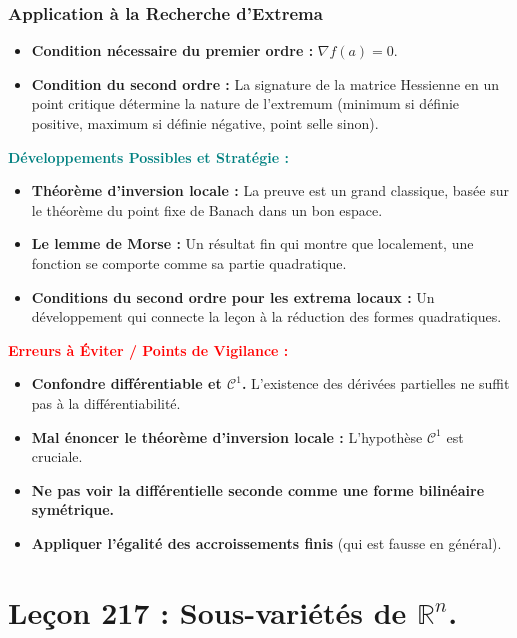 \documentclass[12pt, a4paper, parskip=full]{report}
\theoremstyle{agregstyle}
\newenvironment{developpements}
  {\par\medskip\noindent\begin{oframed}\noindent\textbf{\textcolor{teal}{Développements Possibles et Stratégie :}}}
  {\end{oframed}\par\medskip}
\newenvironment{erreurs}
  {\par\medskip\noindent\begin{oframed}\noindent\textbf{\textcolor{red}{Erreurs à Éviter / Points de Vigilance :}}}
  {\end{oframed}\par\medskip}
\begin{document}
\subsection{Application à la Recherche d'Extrema}
\begin{itemize}
    \item \textbf{Condition nécessaire du premier ordre :} $\nabla f(a) = 0$.
    \item \textbf{Condition du second ordre :} La signature de la matrice Hessienne en un point critique détermine la nature de l'extremum (minimum si définie positive, maximum si définie négative, point selle sinon).
\end{itemize}

\begin{developpements}
    \begin{itemize}
        \item \textbf{Théorème d'inversion locale :} La preuve est un grand classique, basée sur le théorème du point fixe de Banach dans un bon espace.
        \item \textbf{Le lemme de Morse :} Un résultat fin qui montre que localement, une fonction se comporte comme sa partie quadratique.
        \item \textbf{Conditions du second ordre pour les extrema locaux :} Un développement qui connecte la leçon à la réduction des formes quadratiques.
    \end{itemize}
\end{developpements}

\begin{erreurs}
    \begin{itemize}
        \item \textbf{Confondre différentiable et $\mathcal{C}^1$.} L'existence des dérivées partielles ne suffit pas à la différentiabilité.
        \item \textbf{Mal énoncer le théorème d'inversion locale :} L'hypothèse $\mathcal{C}^1$ est cruciale.
        \item \textbf{Ne pas voir la différentielle seconde comme une forme bilinéaire symétrique.}
        \item \textbf{Appliquer l'égalité des accroissements finis} (qui est fausse en général).
    \end{itemize}
\end{erreurs}
\chapter{Leçon 217 : Sous-variétés de $\mathbb{R}^n$.}
\end{document}
